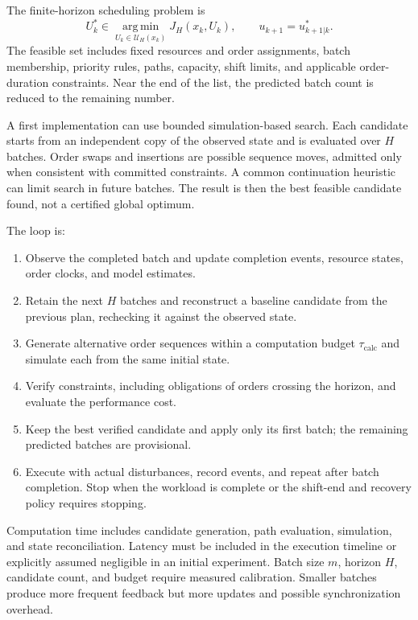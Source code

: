 The finite-horizon scheduling problem is
\begin{equation}
 U_k^*\in\underset{U_k\in\mathcal U_H(x_k)}{\operatorname{arg\,min}}
 J_H(x_k,U_k),\qquad u_{k+1}=u_{k+1|k}^*.
\end{equation}
The feasible set includes fixed resources and order assignments, batch
membership, priority rules, paths, capacity, shift limits, and applicable
order-duration constraints. Near the end of the list, the predicted batch
count is reduced to the remaining number.

A first implementation can use bounded simulation-based search. Each
candidate starts from an independent copy of the observed state and is
evaluated over $H$ batches. Order swaps and insertions are possible sequence
moves, admitted only when consistent with committed constraints. A common
continuation heuristic can limit search in future batches. The result is
then the best feasible candidate found, not a certified global optimum.

The loop is:
\begin{enumerate}
 \item Observe the completed batch and update completion events, resource
 states, order clocks, and model estimates.
 \item Retain the next $H$ batches and reconstruct a baseline candidate from
 the previous plan, rechecking it against the observed state.
 \item Generate alternative order sequences within a computation budget
 $\tau_{\mathrm{calc}}$ and simulate each from the same initial state.
 \item Verify constraints, including obligations of orders crossing the
 horizon, and evaluate the performance cost.
 \item Keep the best verified candidate and apply only its first batch;
 the remaining predicted batches are provisional.
 \item Execute with actual disturbances, record events, and repeat after
 batch completion. Stop when the workload is complete or the shift-end
 and recovery policy requires stopping.
\end{enumerate}

Computation time includes candidate generation, path evaluation, simulation,
and state reconciliation. Latency must be included in the execution timeline
or explicitly assumed negligible in an initial experiment. Batch size $m$,
horizon $H$, candidate count, and budget require measured calibration.
Smaller batches produce more frequent feedback but more updates and possible
synchronization overhead.

